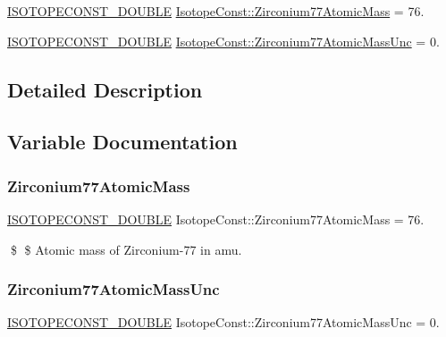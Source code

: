 \begin{DoxyCompactItemize}
\item 
\mbox{\hyperlink{group___isotope_const-_macros_ga8f45a7272ce02c0b4c65c44636ed719a}{I\+S\+O\+T\+O\+P\+E\+C\+O\+N\+S\+T\+\_\+\+D\+O\+U\+B\+LE}} \mbox{\hyperlink{group___isotope_const-_zirconium-_zr77_ga4ce49fec3dec4c7f898ad00f1ad85e7c}{Isotope\+Const\+::\+Zirconium77\+Atomic\+Mass}} = 76.
\item 
\mbox{\hyperlink{group___isotope_const-_macros_ga8f45a7272ce02c0b4c65c44636ed719a}{I\+S\+O\+T\+O\+P\+E\+C\+O\+N\+S\+T\+\_\+\+D\+O\+U\+B\+LE}} \mbox{\hyperlink{group___isotope_const-_zirconium-_zr77_ga3a10ae00df7697add5942017a45bcedd}{Isotope\+Const\+::\+Zirconium77\+Atomic\+Mass\+Unc}} = 0.
\end{DoxyCompactItemize}


\subsection{Detailed Description}


\subsection{Variable Documentation}
\mbox{\label{group___isotope_const-_zirconium-_zr77_ga4ce49fec3dec4c7f898ad00f1ad85e7c}} 
\subsubsection{\texorpdfstring{Zirconium77\+Atomic\+Mass}{Zirconium77AtomicMass}}
{\footnotesize\ttfamily \mbox{\hyperlink{group___isotope_const-_macros_ga8f45a7272ce02c0b4c65c44636ed719a}{I\+S\+O\+T\+O\+P\+E\+C\+O\+N\+S\+T\+\_\+\+D\+O\+U\+B\+LE}} Isotope\+Const\+::\+Zirconium77\+Atomic\+Mass = 76.}

\$ \$ Atomic mass of Zirconium-\/77 in amu. \mbox{\label{group___isotope_const-_zirconium-_zr77_ga3a10ae00df7697add5942017a45bcedd}} 
\subsubsection{\texorpdfstring{Zirconium77\+Atomic\+Mass\+Unc}{Zirconium77AtomicMassUnc}}
{\footnotesize\ttfamily \mbox{\hyperlink{group___isotope_const-_macros_ga8f45a7272ce02c0b4c65c44636ed719a}{I\+S\+O\+T\+O\+P\+E\+C\+O\+N\+S\+T\+\_\+\+D\+O\+U\+B\+LE}} Isotope\+Const\+::\+Zirconium77\+Atomic\+Mass\+Unc = 0.}

